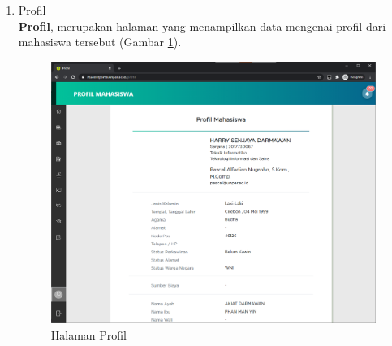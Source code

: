 \begin{enumerate}
    \item Profil\\
    \textbf{Profil}, merupakan halaman yang menampilkan data mengenai profil dari mahasiswa tersebut (Gambar \ref{fig:3_profil}).
    
    \begin{figure}[H]
    	\centering
    	\includegraphics[scale=0.45]{Gambar/profil.png}
    	\caption{Halaman Profil} 
    	\label{fig:3_profil}
    \end{figure}
\end{enumerate}

